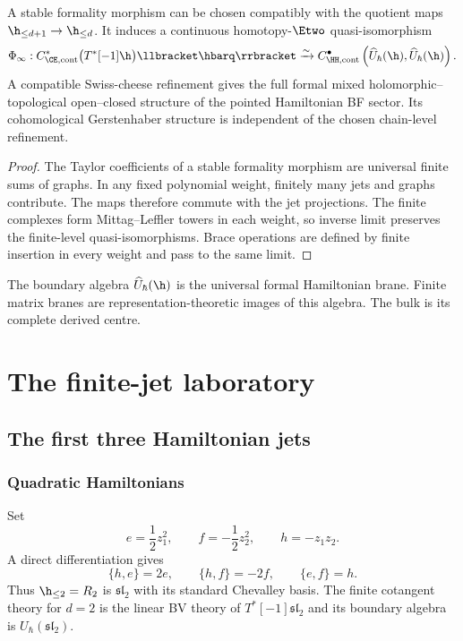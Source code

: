 \begin{theorem}
A stable formality morphism can be chosen compatibly with the quotient maps $\h_{\le d+1}\to\h_{\le d}$.  It induces a continuous homotopy-$\Etwo$ quasi-isomorphism
\[
 \Phi_\infty:
 C^*_{\CE,\mathrm{cont}}\bigl(T^*[-1]\h\bigr)\llbracket\hbarq\rrbracket
 \xrightarrow{\sim}
 C^\bullet_{\HH,\mathrm{cont}}
 \left(\widehat U_\hbar(\h),\widehat U_\hbar(\h)\right).
\]
A compatible Swiss-cheese refinement gives the full formal mixed holomorphic--topological open--closed structure of the pointed Hamiltonian BF sector.  Its cohomological Gerstenhaber structure is independent of the chosen chain-level refinement.
\end{theorem}
\begin{proof}
The Taylor coefficients of a stable formality morphism are universal finite sums of graphs.  In any fixed polynomial weight, finitely many jets and graphs contribute.  The maps therefore commute with the jet projections.  The finite complexes form Mittag--Leffler towers in each weight, so inverse limit preserves the finite-level quasi-isomorphisms.  Brace operations are defined by finite insertion in every weight and pass to the same limit.
\end{proof}

\begin{principle}
The boundary algebra $\widehat U_\hbar(\h)$ is the universal formal Hamiltonian brane.  Finite matrix branes are representation-theoretic images of this algebra.  The bulk is its complete derived centre.
\end{principle}


\part{The finite-jet laboratory}

\chapter{The first three Hamiltonian jets}
\section{Quadratic Hamiltonians}
Set
\[
 e=\frac12z_1^2,
 \qquad
 f=-\frac12z_2^2,
 \qquad
 h=-z_1z_2.
\]
A direct differentiation gives
\[
 \{h,e\}=2e,
 \qquad
 \{h,f\}=-2f,
 \qquad
 \{e,f\}=h.
\]
Thus $\h_{\le2}=R_2$ is $\mathfrak{sl}_2$ with its standard Chevalley basis.  The finite cotangent theory for $d=2$ is the linear BV theory of $T^*[-1]\mathfrak{sl}_2$ and its boundary algebra is $U_\hbar(\mathfrak{sl}_2)$.

